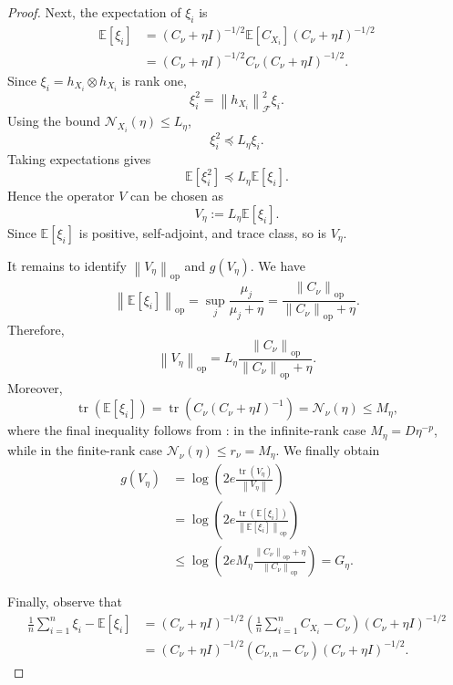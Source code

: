 \documentclass[11pt]{article}
\newcommand{\E}{\mathbb{E}}
\newcommand{\F}{\mathcal{F}}
\newcommand{\Ncal}{\mathcal{N}}
\newcommand{\op}{\mathrm{op}}
\newcommand{\tr}{\operatorname{tr}}
\newcommand{\norm}[1]{\left\lVert #1\right\rVert}
\newcommand{\preceqL}{\preceq}
\begin{document}
\begin{proof}
Next, the expectation of $\xi_i$ is
\begin{align*}
    \E[\xi_i]
    &=
    (C_\nu+\eta I)^{-1/2}
    \E[C_{X_i}]
    (C_\nu+\eta I)^{-1/2} \\
    &=
    (C_\nu+\eta I)^{-1/2}
    C_\nu
    (C_\nu+\eta I)^{-1/2}.
\end{align*}
Since $\xi_i=h_{X_i}\otimes h_{X_i}$ is rank one,
\[
    \xi_i^2
    =
    \norm{h_{X_i}}_{\F}^2\xi_i.
\]
Using the bound $\Ncal_{X_i}(\eta)\le L_\eta$,
\[
    \xi_i^2
    \preceqL
    L_\eta\xi_i.
\]
Taking expectations gives
\[
    \E[\xi_i^2]
    \preceqL
    L_\eta\E[\xi_i].
\]
Hence the operator $V$ can be chosen as
\begin{equation}
\label{eq:bernstein_V_identification}
    V_\eta
    :=
    L_\eta\E[\xi_i].
\end{equation}
Since $\E[\xi_i]$ is positive, self-adjoint, and trace class, so is
$V_\eta$.

It remains to identify $\norm{V_\eta}_{\op}$ and $g(V_\eta)$. We have
\[
    \norm{\E[\xi_i]}_{\op}
    =
    \sup_j\frac{\mu_j}{\mu_j+\eta}
    =
    \frac{\norm{C_\nu}_{\op}}
         {\norm{C_\nu}_{\op}+\eta}.
\]
Therefore,
\begin{equation}
\label{eq:bernstein_V_norm}
    \norm{V_\eta}_{\op}
    =
    L_\eta
    \frac{\norm{C_\nu}_{\op}}
         {\norm{C_\nu}_{\op}+\eta}.
\end{equation}
Moreover,
\[
    \tr(\E[\xi_i])
    =
    \tr\!\left(
        C_\nu(C_\nu+\eta I)^{-1}
    \right)
    =
    \Ncal_\nu(\eta)
    \leq
    M_\eta,
\]
where the final inequality follows from : in the infinite-rank case $M_\eta=D\eta^{-p}$, while in the finite-rank case $\Ncal_\nu(\eta)\le r_\nu=M_\eta$. We finally obtain
\begin{align*}
    g(V_\eta)
    &=
    \log\!\left(
        2e
        \frac{\tr(V_\eta)}
             {\norm{V_\eta}}
    \right) \\
    &=
    \log\!\left(
        2e
        \frac{\tr(\E[\xi_i])}
             {\norm{\E[\xi_i]}_{\op}}
    \right) \\
    &\leq
    \log\!\left(
        2eM_\eta
        \frac{\norm{C_\nu}_{\op}+\eta}
             {\norm{C_\nu}_{\op}}
    \right)
    =
    G_\eta.
\end{align*}

Finally, observe that
\begin{align*}
    \frac1n\sum_{i=1}^n\xi_i- \E[\xi_i]
    &=
    (C_\nu+\eta I)^{-1/2}
    \left(
        \frac1n\sum_{i=1}^n C_{X_i}-C_\nu
    \right)
    (C_\nu+\eta I)^{-1/2} \\
    &=
    (C_\nu+\eta I)^{-1/2}
    (C_{\nu,n}-C_\nu)
    (C_\nu+\eta I)^{-1/2}.
\end{align*}


\end{proof}
\end{document}
